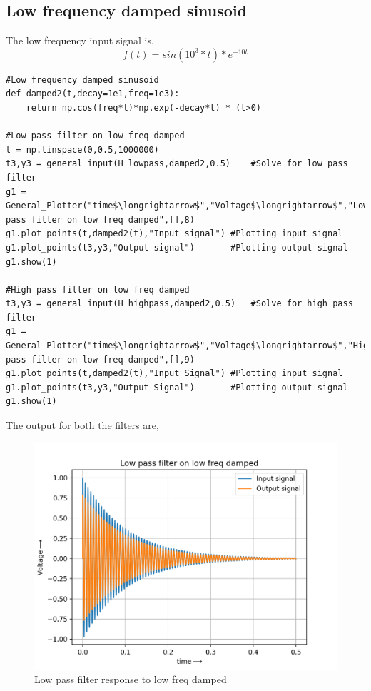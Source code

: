 \documentclass[11pt, a4paper]{article}
\begin{document}
\subsection{Low frequency damped sinusoid}
The low frequency input signal is,
\begin{equation}
    f(t) = sin(10^3*t)*e^{-10t}
\end{equation}
\begin{lstlisting}
#Low frequency damped sinusoid
def damped2(t,decay=1e1,freq=1e3):
	return np.cos(freq*t)*np.exp(-decay*t) * (t>0)

#Low pass filter on low freq damped
t = np.linspace(0,0.5,1000000)
t3,y3 = general_input(H_lowpass,damped2,0.5)	#Solve for low pass filter
g1 = General_Plotter("time$\longrightarrow$","Voltage$\longrightarrow$","Low pass filter on low freq damped",[],8)
g1.plot_points(t,damped2(t),"Input signal")	#Plotting input signal
g1.plot_points(t3,y3,"Output signal")		#Plotting output signal
g1.show(1)

#High pass filter on low freq damped
t3,y3 = general_input(H_highpass,damped2,0.5)	#Solve for high pass filter
g1 = General_Plotter("time$\longrightarrow$","Voltage$\longrightarrow$","High pass filter on low freq damped",[],9)
g1.plot_points(t,damped2(t),"Input Signal")	#Plotting input signal
g1.plot_points(t3,y3,"Output Signal")		#Plotting output signal
g1.show(1)
\end{lstlisting}
The output for both the filters are,
\begin{figure}[!tbh]
   	\centering
   	\includegraphics[scale=0.5]{low_pass_low_damped.png}   
   	\caption{Low pass filter response to low freq damped}
   	\label{fig:Figure_1}
\end{figure}
\end{document}
